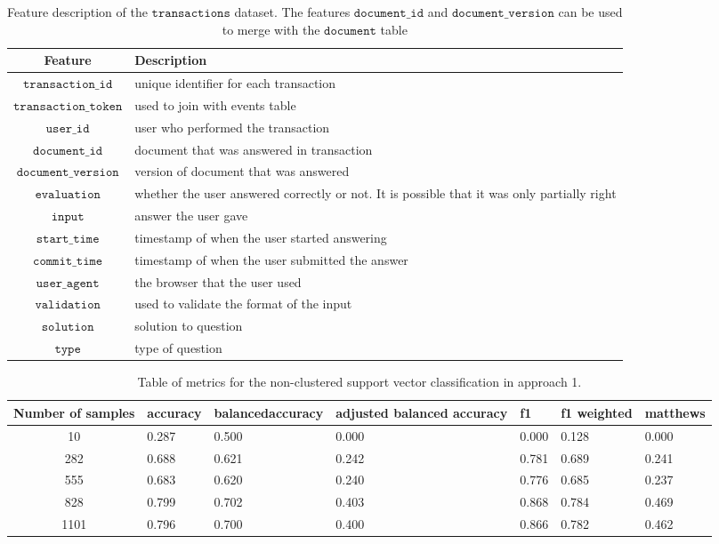\documentclass[sigplan,screen]{acmart}
\begin{document}
\begin{table}[h]
  \caption{Feature description of the $\texttt{transactions}$ dataset. The features $\texttt{document\_id}$ and $\texttt{document\_version}$ can be used to merge with the $\texttt{document}$ table}
  \label{tab:transactions}
  \begin{tabular}{cl}
    \toprule
    \textbf{Feature}&\textbf{Description}\\
    \midrule
    $\texttt{transaction\_id}$ & unique identifier for each transaction \\
    $\texttt{transaction\_token}$ & used to join with events table \\
    $\texttt{user\_id}$ & user who performed the transaction \\
    $\texttt{document\_id}$ & document that was answered in transaction \\
    $\texttt{document\_version}$ & version of document that was answered \\
    $\texttt{evaluation}$ & whether the user answered correctly or not. It is possible that it was only partially right \\
    $\texttt{input}$ & answer the user gave \\
    $\texttt{start\_time}$ & timestamp of when the user started answering \\
    $\texttt{commit\_time}$ & timestamp of when the user submitted the answer \\
    $\texttt{user\_agent}$ & the browser that the user used \\
    $\texttt{validation}$ & used to validate the format of the input \\
    $\texttt{solution}$ & solution to question \\
    $\texttt{type}$ & type of question \\
    \bottomrule
    \end{tabular}
\end{table}

\begin{table}[h]
  \caption{Table of metrics for the non-clustered support vector classification in approach 1.}
  \label{tab:A1_classification_svc_nocluster}
  \begin{tabular}{cllllll}
    \toprule
    Number of samples & accuracy & balancedaccuracy & adjusted balanced accuracy & f1 & f1 weighted & matthews\\
    \midrule
       10 & 0.287 & 0.500 & 0.000 & 0.000 & 0.128 & 0.000\\
      282 & 0.688 & 0.621 & 0.242 & 0.781 & 0.689 & 0.241\\
      555 & 0.683 & 0.620 & 0.240 & 0.776 & 0.685 & 0.237\\
      828 & 0.799 & 0.702 & 0.403 & 0.868 & 0.784 & 0.469\\
     1101 & 0.796 & 0.700 & 0.400 & 0.866 & 0.782 & 0.462\\
    \bottomrule
    \end{tabular}
\end{table}
\end{document}
